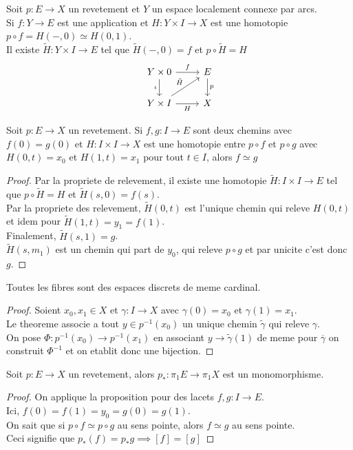 \documentclass[../main.tex]{subfiles}
\begin{document}
\begin{propo}
Soit $p: E\to X$ un revetement et $Y$ un espace localement connexe par arcs.\\
Si $f:Y\to E$ est une application et $H:Y\times I\to X$ est une homotopie $p\circ f = H( -,0) \simeq H( 0,1) $.\\
Il existe $\tilde H : Y\times I \to E$ tel que $\tilde H( -,0) =f$ et $p\circ\tilde H = H$ 
\[\begin{tikzcd}
	{Y\times 0} & E \\
	{Y\times I} & X
	\arrow["f", from=1-1, to=1-2]
	\arrow["\iota"', from=1-1, to=2-1]
	\arrow["p", from=1-2, to=2-2]
	\arrow["H"', from=2-1, to=2-2]
	\arrow["{\tilde H}", from=2-1, to=1-2]
\end{tikzcd}\]

\end{propo}
\begin{propo}
Soit $p: E\to X$ un revetement. Si $f,g: I\to E$ sont deux chemins avec $f( 0) =g( 0) $ et $H: I\times I\to X$ est une homotopie entre $p\circ f$ et $p\circ g$ avec $H( 0,t) = x_0$ et $H( 1,t) =x_1$ pour tout $t\in I$, alors $f\simeq g $ 
\end{propo}
\begin{proof}
Par la propriete de relevement, il existe une homotopie $\tilde H: I\times I \to E$ tel que $p\circ \tilde H= H$ et $\tilde H( s,0) = f( s) $.\\
Par la propriete des relevement, $\tilde H( 0,t)$ est l'unique chemin qui releve $H( 0,t) $ et idem pour $\tilde H( 1,t) =y_1 = f( 1) $.\\
Finalement, $\tilde H( s,1) = g $.\\
$\tilde H( s,m_1) $ est un chemin qui part de $y_0$, qui releve $p\circ g$ et par unicite c'est donc $g$.
\end{proof}
\begin{crly}
Toutes les fibres sont des espaces discrets de meme cardinal.
\end{crly}
\begin{proof}
Soient $x_0,x_1\in X$ et $\gamma:I\to X$ avec $\gamma( 0) = x_0$ et $\gamma( 1) = x_1$.\\
Le theoreme associe a tout $y \in p^{-1}( x_0) $ un unique chemin $\tilde\gamma$ qui releve $\gamma$.\\
On pose $\Phi:p^{-1}( x_0) \to p^{-1}( x_1) $ en associant $y \to \tilde\gamma( 1) $ de meme pour $ \overline{\gamma}$ on construit $\Phi^{-1}$ et on etablit donc une bijection.
\end{proof}
\begin{crly}
Soit $p: E \to X$ un revetement, alors $p_\ast: \pi_1 E \to \pi_1 X$ est un monomorphisme.
\end{crly}
\begin{proof}
On applique la proposition pour des lacets $f,g:I\to E$.\\
Ici, $f( 0) =f( 1) = y_0= g( 0) = g(1) $.\\
On sait que si $p\circ f \simeq p\circ g$ au sens pointe, alors $f\simeq g$ au sens pointe.\\
Ceci signifie que $p_\ast( f) = p_\ast g\implies [ f] = [ g] $ 
\end{proof}
\end{document}
